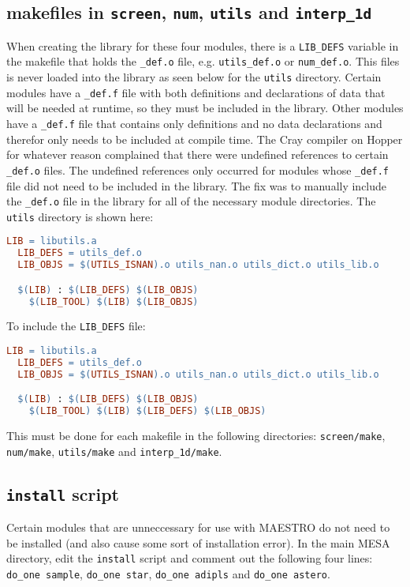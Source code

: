 \subsection{makefiles in {\tt screen}, {\tt num}, {\tt utils} and 
{\tt interp\_1d}}

When creating the library for these four modules, there is a {\tt LIB\_DEFS} 
variable in the makefile that holds the {\tt *\_def.o} file, e.g. 
{\tt utils\_def.o} or {\tt num\_def.o}. This files is never loaded into the 
library as seen below for the {\tt utils} directory. Certain modules have a 
{\tt *\_def.f} file with both definitions and declarations of data that will 
be needed at runtime, so they must be included in the library. Other modules 
have a {\tt *\_def.f} file that contains only definitions and no data 
declarations and therefor only needs to be included at compile time. The Cray 
compiler on Hopper for whatever reason complained that there were undefined 
references to certain {\tt *\_def.o} files. The undefined references only 
occurred for modules whose {\tt *\_def.f} file did not need to be included in 
the library. The fix was to manually include the {\tt *\_def.o} file in the 
library for all of the necessary module directories. The {\tt utils} directory 
is shown here:
\begin{lstlisting}[language=make,mathescape=false]
  LIB = libutils.a
  LIB_DEFS = utils_def.o
  LIB_OBJS = $(UTILS_ISNAN).o utils_nan.o utils_dict.o utils_lib.o

  $(LIB) : $(LIB_DEFS) $(LIB_OBJS)
  	$(LIB_TOOL) $(LIB) $(LIB_OBJS)
\end{lstlisting}
To include the {\tt LIB\_DEFS} file:
\begin{lstlisting}[language=make,mathescape=false]
  LIB = libutils.a
  LIB_DEFS = utils_def.o
  LIB_OBJS = $(UTILS_ISNAN).o utils_nan.o utils_dict.o utils_lib.o

  $(LIB) : $(LIB_DEFS) $(LIB_OBJS)
  	$(LIB_TOOL) $(LIB) $(LIB_DEFS) $(LIB_OBJS)
\end{lstlisting}
This must be done for each makefile in the following directories: 
{\tt screen/make}, {\tt num/make}, {\tt utils/make} and {\tt interp\_1d/make}.

\subsection{{\tt install} script}

Certain modules that are unneccessary for use with {\sf MAESTRO} do not need 
to be installed (and also cause some sort of installation error). In the 
main {\sf MESA} directory, edit the {\tt install} script and comment out 
the following four lines: {\tt do\_one sample}, {\tt do\_one star}, 
{\tt do\_one adipls} and {\tt do\_one astero}.

